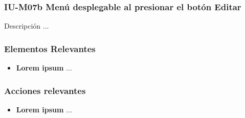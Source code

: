
\subsubsection{IU-M07b Menú desplegable al presionar el botón Editar}

 Descripción ...


\subsubsection{Elementos Relevantes}

    \begin{itemize}
    \item {\bf Lorem ipsum}
        ...
    \end{itemize}

\subsubsection{Acciones relevantes}

    \begin{itemize}
    \item {\bf Lorem ipsum}
        ...
    \end{itemize}

\clearpage
